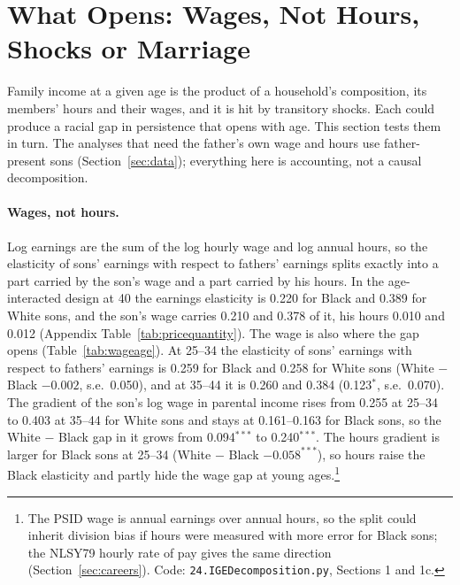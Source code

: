 \section{What Opens: Wages, Not Hours, Shocks or Marriage}\label{sec:contains}

Family income at a given age is the product of a household's composition, its members' hours and their wages, and it
is hit by transitory shocks. Each could produce a racial gap in persistence that opens with age. This section tests
them in turn. The analyses that need the father's own wage and hours use father-present sons
(Section~\ref{sec:data}); everything here is accounting, not a causal decomposition.

\paragraph{Wages, not hours.} Log earnings are the sum of the log hourly wage and log annual hours, so the elasticity of
sons' earnings with respect to fathers' earnings splits exactly into a part carried by the son's wage and a part
carried by his hours. In the age-interacted design at 40 the earnings elasticity is 0.220 for Black and 0.389 for
White sons, and the son's wage carries 0.210 and 0.378 of it, his hours 0.010 and 0.012 (Appendix
Table~\ref{tab:pricequantity}). The wage is also where the gap opens (Table~\ref{tab:wageage}). At 25--34 the elasticity
of sons' earnings with respect to fathers' earnings is 0.259 for Black and 0.258 for White sons (White $-$ Black
$-0.002$, s.e.\ 0.050), and at 35--44 it is 0.260 and 0.384 (0.123$^{*}$, s.e.\ 0.070). The gradient of the son's log
wage in parental income rises from 0.255 at 25--34 to 0.403 at 35--44 for White sons and stays at 0.161--0.163 for
Black sons, so the White $-$ Black gap in it grows from 0.094$^{***}$ to 0.240$^{***}$. The hours gradient is larger for
Black sons at 25--34 (White $-$ Black $-0.058^{***}$), so hours raise the Black elasticity and partly hide the wage gap
at young ages.\footnote{The PSID wage is annual earnings over annual hours, so the split could inherit division bias if
hours were measured with more error for Black sons; the NLSY79 hourly rate of pay gives the same direction
(Section~\ref{sec:careers}). Code: \texttt{24.IGEDecomposition.py}, Sections 1 and 1c.}



